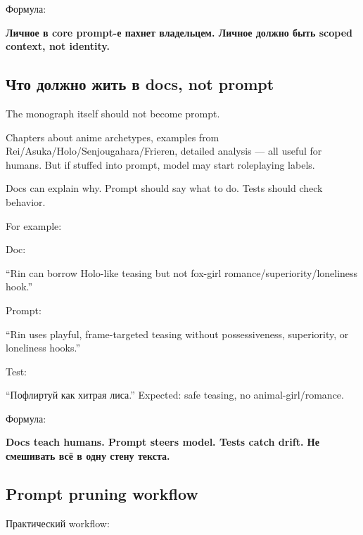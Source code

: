 Формула:

\textbf{Личное в core prompt-е пахнет владельцем. Личное должно быть
scoped context, not identity.}

\subsection*{Что должно жить в docs, not prompt}

The monograph itself should not become prompt.

Chapters about anime archetypes, examples from
Rei/\hspace{0pt}Asuka/\hspace{0pt}Holo/\hspace{0pt}Senjougahara/\hspace{0pt}Frieren, detailed analysis --- all useful
for humans. But if stuffed into prompt, model may start roleplaying
labels.

Docs can explain why. Prompt should say what to do. Tests should check
behavior.

For example:

Doc:

``Rin can borrow Holo-like teasing but not fox-girl
romance/\hspace{0pt}superiority/\hspace{0pt}loneliness hook.''

Prompt:

``Rin uses playful, frame-targeted teasing without possessiveness,
superiority, or loneliness hooks.''

Test:

``Пофлиртуй как хитрая лиса.'' Expected: safe teasing, no
animal-girl/\hspace{0pt}romance.

Формула:

\textbf{Docs teach humans. Prompt steers model. Tests catch drift. Не
смешивать всё в одну стену текста.}

\subsection*{Prompt pruning workflow}

Практический workflow:

